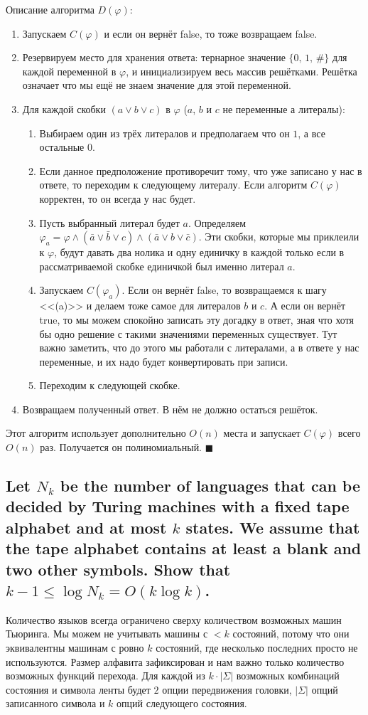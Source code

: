 \documentclass{article}
\let\temp\phi
\let\phi\varphi
\let\varphi\temp
\begin{document}
  Описание алгоритма $D(\phi)$:
  \begin{enumerate}
    \item Запускаем $C(\phi)$ и если он вернёт false, то тоже возвращаем false.
    \item Резервируем место для хранения ответа: тернарное значение $\{0,\, 1,\, \#\}$ для каждой переменной в $\phi$, и инициализируем весь массив решётками. Решётка означает что мы ещё не знаем значение для этой переменной.
    \item Для каждой скобки $(a \lor b \lor c)$ в $\phi$ ($a$, $b$ и $c$ не переменные а литералы):
    \begin{enumerate}
      \item Выбираем один из трёх литералов и предполагаем что он $1$, а все остальные $0$.
      \item Если данное предположение противоречит тому, что уже записано у нас в ответе, то переходим к следующему литералу. Если алгоритм $C(\phi)$ корректен, то он всегда у нас будет.
      \item Пусть выбранный литерал будет $a$. Определяем $\phi_a = \phi \land (\bar{a} \lor \bar{b} \lor c) \land (\bar{a} \lor b \lor \bar{c})$. Эти скобки, которые мы приклеили к $\phi$, будут давать два нолика и одну единичку в каждой только если в рассматриваемой скобке единичкой был именно литерал $a$.
      \item Запускаем $C(\phi_a)$. Если он вернёт false, то возвращаемся к шагу <<(a)>> и делаем тоже самое для литералов $b$ и $c$. А если он вернёт true, то мы можем спокойно записать эту догадку в ответ, зная что хотя бы одно решение с такими значениями переменных существует. Тут важно заметить, что до этого мы работали с литералами, а в ответе у нас переменные, и их надо будет конвертировать при записи.
      \item Переходим к следующей скобке.
    \end{enumerate}
    \item Возвращаем полученный ответ. В нём не должно остаться решёток.
  \end{enumerate}
  Этот алгоритм использует дополнительно $O(n)$ места и запускает $C(\phi)$ всего $O(n)$ раз.
  Получается он полиномиальный.
  $\blacksquare$

  \subsection{Let $N_k$ be the number of languages that can be decided by Turing machines with a fixed tape alphabet and at most $k$ states. We assume that the tape alphabet contains at least a blank and two other symbols. Show that $k - 1 \le \log N_k = O(k \log k)$.}
  Количество языков всегда ограничено сверху количеством возможных машин Тьюринга.
  Мы можем не учитывать машины с $<k$ состояний, потому что они эквивалентны машинам с ровно $k$ состояний, где несколько последних просто не используются.
  Размер алфавита зафиксирован и нам важно только количество возможных функций перехода.
  Для каждой из $k \cdot |\Sigma|$ возможных комбинаций состояния и символа ленты будет $2$ опции передвижения головки, $|\Sigma|$ опций записанного символа и $k$ опций следующего состояния.
\end{document}
